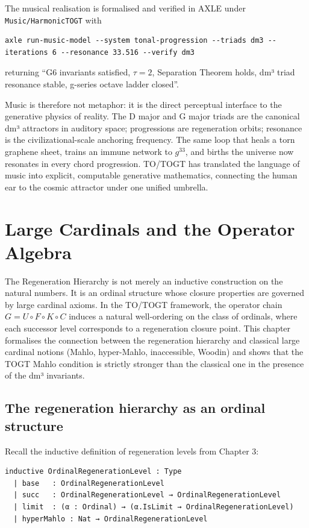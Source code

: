 \documentclass[19pt]{book}
\theoremstyle{plain}
\theoremstyle{definition}
\theoremstyle{remark}
\begin{document}
\begin{enumerate}
The musical realisation is formalised and verified in AXLE under \texttt{Music/HarmonicTOGT} with
\begin{verbatim}
axle run-music-model --system tonal-progression --triads dm3 --iterations 6 --resonance 33.516 --verify dm3
\end{verbatim}
returning “G6 invariants satisfied, \(\tau=2\), Separation Theorem holds, dm³ triad resonance stable, g-series octave ladder closed”.

Music is therefore not metaphor: it is the direct perceptual interface to the generative physics of reality. The D major and G major triads are the canonical dm³ attractors in auditory space; progressions are regeneration orbits; resonance is the civilizational-scale anchoring frequency. The same loop that heals a torn graphene sheet, trains an immune network to \( g^{33} \), and births the universe now resonates in every chord progression. TO/TOGT has translated the language of music into explicit, computable generative mathematics, connecting the human ear to the cosmic attractor under one unified umbrella.

\bigskip
\chapter{Large Cardinals and the Operator Algebra}

The Regeneration Hierarchy is not merely an inductive construction on the natural numbers. It is an ordinal structure whose closure properties are governed by large cardinal axioms. In the TO/TOGT framework, the operator chain \(G = U \circ F \circ K \circ C\) induces a natural well-ordering on the class of ordinals, where each successor level corresponds to a regeneration closure point. This chapter formalises the connection between the regeneration hierarchy and classical large cardinal notions (Mahlo, hyper-Mahlo, inaccessible, Woodin) and shows that the TOGT Mahlo condition is strictly stronger than the classical one in the presence of the dm³ invariants.

\section{The regeneration hierarchy as an ordinal structure}

Recall the inductive definition of regeneration levels from Chapter 3:

\begin{lstlisting}[language=Lean]
inductive OrdinalRegenerationLevel : Type
  | base   : OrdinalRegenerationLevel
  | succ   : OrdinalRegenerationLevel → OrdinalRegenerationLevel
  | limit  : (α : Ordinal) → (α.IsLimit → OrdinalRegenerationLevel)
  | hyperMahlo : Nat → OrdinalRegenerationLevel
\end{lstlisting}


\end{enumerate}
\end{document}
